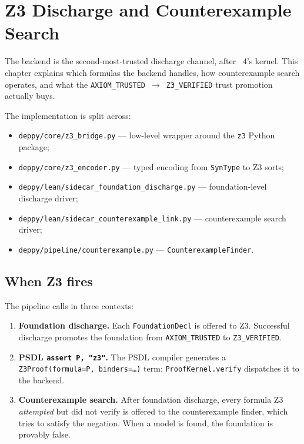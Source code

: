 \chapter{Z3 Discharge and Counterexample Search}
\label{ch:z3}

The \Zthree{} \citep{Z3} backend is the second-most-trusted
discharge channel, after \Lean{}~4's kernel.  This chapter explains
which formulas the backend handles, how counterexample search
operates, and what the
\texttt{AXIOM\_TRUSTED}~$\to$~\texttt{Z3\_VERIFIED} trust
promotion actually buys.

The implementation is split across:
\begin{itemize}[leftmargin=1.7em]
  \item \texttt{deppy/core/z3\_bridge.py} --- low-level wrapper
    around the \texttt{z3} Python package;
  \item \texttt{deppy/core/z3\_encoder.py} --- typed encoding from
    \texttt{SynType} to Z3 sorts;
  \item \texttt{deppy/lean/sidecar\_foundation\_discharge.py} ---
    foundation-level discharge driver;
  \item \texttt{deppy/lean/sidecar\_counterexample\_link.py} ---
    counterexample search driver;
  \item \texttt{deppy/pipeline/counterexample.py} ---
    \texttt{CounterexampleFinder}.
\end{itemize}

\section{When Z3 fires}
\label{sec:z3-when}

The \Deppy{} pipeline calls \Zthree{} in three contexts:

\begin{enumerate}[leftmargin=1.7em]
  \item \textbf{Foundation discharge.}  Each
    \texttt{FoundationDecl} is offered to Z3.  Successful
    discharge promotes the foundation from
    \texttt{AXIOM\_TRUSTED} to \texttt{Z3\_VERIFIED}.

  \item \textbf{PSDL \texttt{assert P, "z3"}.}  The PSDL compiler
    generates a \texttt{Z3Proof(formula=P, binders=\dots)} term;
    \texttt{ProofKernel.verify} dispatches it to the backend.

  \item \textbf{Counterexample search.}  After foundation discharge,
    every formula Z3 \emph{attempted} but did not verify is offered
    to the counterexample finder, which tries to satisfy the
    negation.  When a model is found, the foundation is provably
    false.
\end{enumerate}

